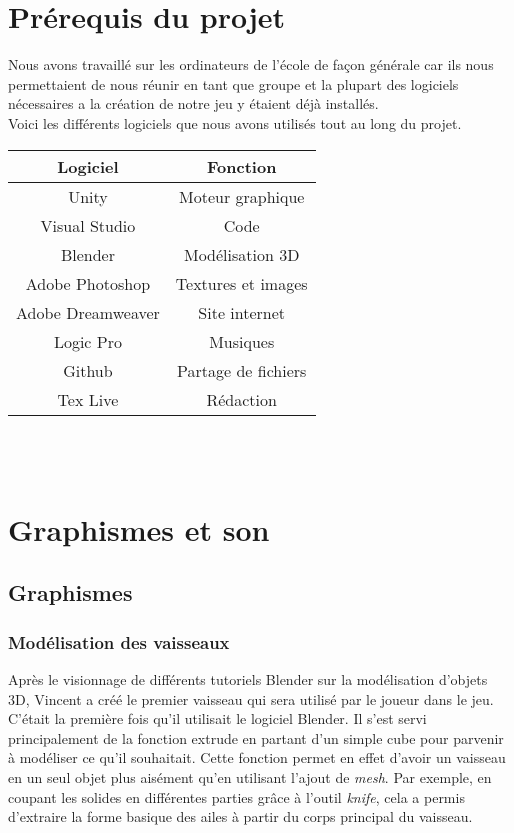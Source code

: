 \documentclass[12pt, titlepage]{article}
\begin{document}
\begin{spacing}{1.5}
\section{Prérequis du projet}

Nous avons travaillé sur les ordinateurs de l'école de façon générale car ils nous permettaient de nous réunir en tant que groupe et la plupart des logiciels nécessaires a la création de notre jeu y étaient déjà installés.\\

Voici les différents logiciels que nous avons utilisés tout au long du projet.\\

\begin{tabular}{|c|c|}
\hline
Logiciel & Fonction\\
\hline
Unity & Moteur graphique\\
\hline
Visual Studio & Code\\
\hline
Blender & Modélisation 3D\\
\hline
Adobe Photoshop & Textures et images\\
\hline
Adobe Dreamweaver & Site internet\\
\hline
Logic Pro & Musiques\\
\hline
Github & Partage de fichiers\\
\hline
Tex Live & Rédaction\\
\hline
\end{tabular}\\
\\

\newpage
\section{Graphismes et son}

\subsection{Graphismes}

\subsubsection{Modélisation des vaisseaux}

Après le visionnage de différents tutoriels Blender sur la modélisation d'objets 3D, Vincent a créé le premier vaisseau qui sera utilisé par le joueur dans le jeu. C'était la première fois qu'il utilisait le logiciel Blender. Il s'est servi principalement de la fonction extrude en partant d'un simple cube pour parvenir à modéliser ce qu'il souhaitait. Cette fonction permet en effet d'avoir un vaisseau en un seul objet plus aisément qu'en utilisant l'ajout de \textit{mesh}. Par exemple, en coupant les solides en différentes parties grâce à l'outil \textit{knife}, cela a permis d'extraire la forme basique des ailes à partir du corps principal du vaisseau.\\


\end{spacing}
\end{document}
